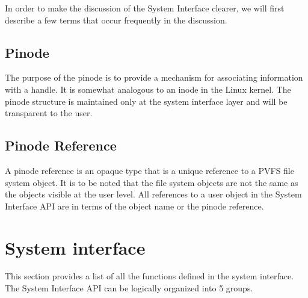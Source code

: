 \documentclass[11pt, letterpaper]{article}
\begin{document}
In order to make the discussion of the System Interface clearer, we will
first describe a few terms that occur frequently in the discussion.

\subsection{Pinode}

The purpose of the pinode is to provide a mechanism for associating
information with a handle.  It is somewhat analogous to an inode in the
Linux kernel.  The pinode structure is maintained only at the system
interface layer and will be transparent to the user.  

\subsection{Pinode Reference}

A pinode reference is an opaque type that is a unique reference to a
PVFS file system object. It is to be noted that the file system objects
are not the same as the objects visible at the user level. All
references to a user object in the System Interface API are in terms of
the object name or the pinode reference.

\section{System interface}

This section provides a list of all the functions defined in the 
system interface. The System Interface API can be logically organized
into 5 groups.
\end{document}
